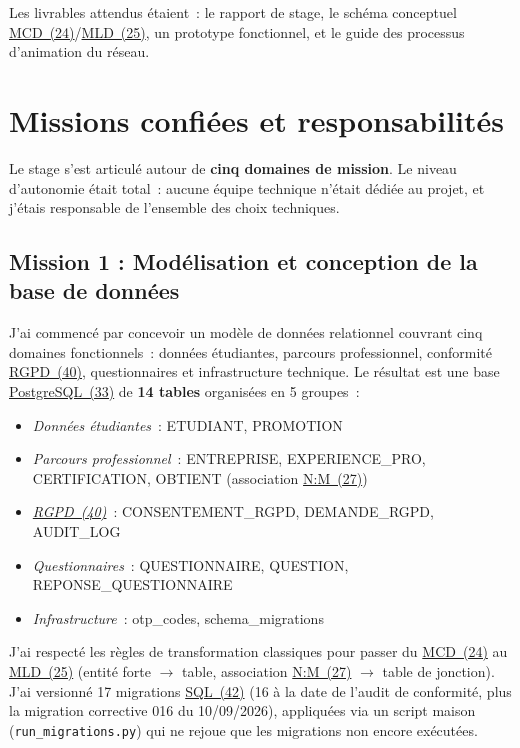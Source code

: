 \documentclass[12pt,a4paper]{report}
\begin{document}
Les livrables attendus étaient~: le rapport de stage, le schéma conceptuel \hyperlink{abbr-MCD}{MCD~(24)}/\hyperlink{abbr-MLD}{MLD~(25)}, un prototype fonctionnel, et le guide des processus d'animation du réseau.

\section{Missions confiées et responsabilités}

Le stage s'est articulé autour de \textbf{cinq domaines de mission}. Le niveau d'autonomie était total~: aucune équipe technique n'était dédiée au projet, et j'étais responsable de l'ensemble des choix techniques.

\subsection{Mission 1 : Modélisation et conception de la base de données}

J'ai commencé par concevoir un modèle de données relationnel couvrant cinq domaines fonctionnels~: données étudiantes, parcours professionnel, conformité \hyperlink{abbr-RGPD}{RGPD~(40)}, questionnaires et infrastructure technique. Le résultat est une base \hyperlink{abbr-PostgreSQL}{PostgreSQL~(33)} de \textbf{14 tables} organisées en 5 groupes~:

\begin{itemize}
  \item \textit{Données étudiantes}~: ETUDIANT, PROMOTION
  \item \textit{Parcours professionnel}~: ENTREPRISE, EXPERIENCE\_PRO, CERTIFICATION, OBTIENT (association \hyperlink{abbr-NM}{N:M~(27)})
  \item \textit{\hyperlink{abbr-RGPD}{RGPD~(40)}}~: CONSENTEMENT\_RGPD, DEMANDE\_RGPD, AUDIT\_LOG
  \item \textit{Questionnaires}~: QUESTIONNAIRE, QUESTION, REPONSE\_QUESTIONNAIRE
  \item \textit{Infrastructure}~: otp\_codes, schema\_migrations
\end{itemize}

J'ai respecté les règles de transformation classiques pour passer du \hyperlink{abbr-MCD}{MCD~(24)} au \hyperlink{abbr-MLD}{MLD~(25)} (entité forte $\rightarrow$ table, association \hyperlink{abbr-NM}{N:M~(27)} $\rightarrow$ table de jonction). J'ai versionné 17 migrations \hyperlink{abbr-SQL}{SQL~(42)} (16 à la date de l'audit de conformité, plus la migration corrective 016 du 10/09/2026), appliquées via un script maison (\texttt{run\_migrations.py}) qui ne rejoue que les migrations non encore exécutées.
\end{document}
